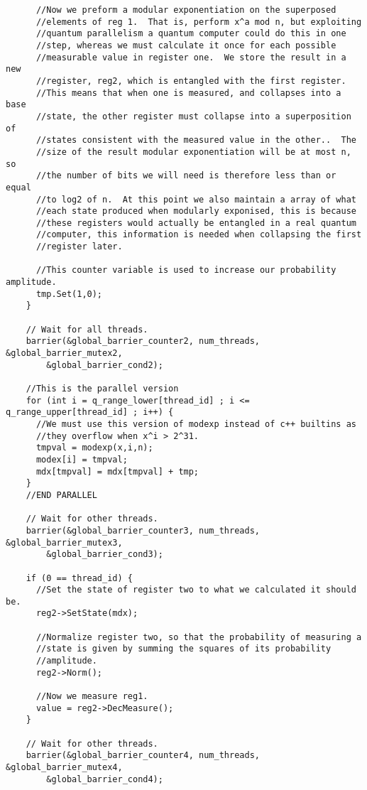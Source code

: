 \documentclass[]{article}
\begin{document}
\begin{verbatim}
      //Now we preform a modular exponentiation on the superposed
      //elements of reg 1.  That is, perform x^a mod n, but exploiting
      //quantum parallelism a quantum computer could do this in one
      //step, whereas we must calculate it once for each possible
      //measurable value in register one.  We store the result in a new
      //register, reg2, which is entangled with the first register.
      //This means that when one is measured, and collapses into a base
      //state, the other register must collapse into a superposition of
      //states consistent with the measured value in the other..  The
      //size of the result modular exponentiation will be at most n, so
      //the number of bits we will need is therefore less than or equal
      //to log2 of n.  At this point we also maintain a array of what
      //each state produced when modularly exponised, this is because
      //these registers would actually be entangled in a real quantum
      //computer, this information is needed when collapsing the first
      //register later.
      
      //This counter variable is used to increase our probability amplitude.
      tmp.Set(1,0);
    }

    // Wait for all threads.
    barrier(&global_barrier_counter2, num_threads, &global_barrier_mutex2, 
	    &global_barrier_cond2);

    //This is the parallel version
    for (int i = q_range_lower[thread_id] ; i <= q_range_upper[thread_id] ; i++) {
      //We must use this version of modexp instead of c++ builtins as
      //they overflow when x^i > 2^31.
      tmpval = modexp(x,i,n);
      modex[i] = tmpval;
      mdx[tmpval] = mdx[tmpval] + tmp;
    }
    //END PARALLEL

    // Wait for other threads.
    barrier(&global_barrier_counter3, num_threads, &global_barrier_mutex3, 
	    &global_barrier_cond3);

    if (0 == thread_id) {
      //Set the state of register two to what we calculated it should be.
      reg2->SetState(mdx);
      
      //Normalize register two, so that the probability of measuring a
      //state is given by summing the squares of its probability
      //amplitude.
      reg2->Norm();
      
      //Now we measure reg1. 
      value = reg2->DecMeasure();
    }  

    // Wait for other threads.
    barrier(&global_barrier_counter4, num_threads, &global_barrier_mutex4, 
	    &global_barrier_cond4);


\end{verbatim}
\end{document}
